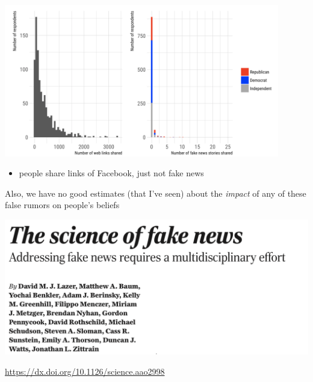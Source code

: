 \documentclass[aspectratio=169]{beamer}
\begin{document}
\begin{frame} 

\begin{center}
\includegraphics[width=0.9\textwidth]{figures/guess_less_2019_fig1}
\end{center}

\begin{itemize}
\item people share links of Facebook, just not fake news
\end{itemize}

\end{frame}
\begin{frame} 

Also, we have no good estimates (that I've seen) about the \emph{impact} of any of these false rumors on people's beliefs

\end{frame}
\begin{frame}

\begin{center}
\includegraphics[width=\textwidth]{figures/lazer_science_2018_title}
\end{center}

\url{https://dx.doi.org/10.1126/science.aao2998}

\end{frame}
\end{document}
